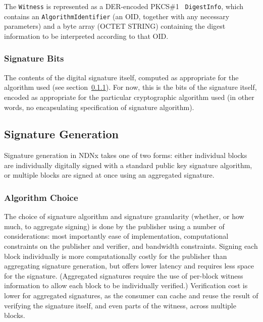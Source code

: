 The {\tt Witness} is represented as a DER-encoded PKCS\#1 {\tt
  DigestInfo}, which contains an {\tt AlgorithmIdentifier} (an OID,
together with any necessary parameters) and a byte array (OCTET
STRING) containing the digest information to be interpreted according
to that OID.


\subsubsection{Signature Bits}

The contents of the digital signature itself, computed as appropriate
for the algorithm used (see
section~\ref{sec:SignatureAlgorithmChoice}). For now, this is the bits
of the signature itself, encoded as appropriate for the particular
cryptographic algorithm used (in other words, no encapsulating
specification of signature algorithm).


\subsection{Signature Generation}

Signature generation in NDNx takes one of two forms: either individual
blocks are individually digitally signed with a standard public key
signature algorithm, or multiple blocks are signed at once using an
aggregated signature.


\subsubsection{Algorithm Choice}
\label{sec:SignatureAlgorithmChoice}

The choice of signature algorithm and signature granularity (whether,
or how much, to aggregate signing) is done by the publisher using a
number of considerations: most importantly ease of implementation,
computational constraints on the publisher and verifier, and bandwidth
constraints. Signing each block individually is more computationally
costly for the publisher than aggregating signature generation, but
offers lower latency and requires less space for the
signature. (Aggregated signatures require the use of per-block witness
information to allow each block to be individually verified.)
Verification cost is lower for aggregated signatures, as the consumer
can cache and reuse the result of verifying the signature itself, and
even parts of the witness, across multiple blocks.

